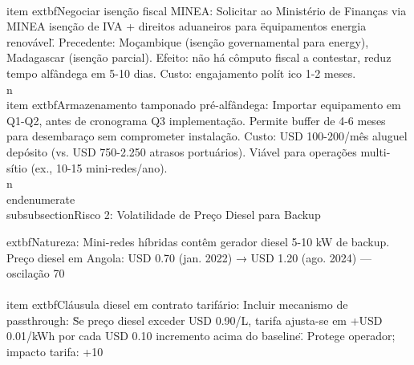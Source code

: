\documentclass[12pt, a4paper]{article}
\begin{document}
{{{{{{{{{\\item 	extbf{Negociar isenção fiscal MINEA:} Solicitar ao Ministério de Finanças via MINEA isenção de IVA + direitos aduaneiros para \"equipamentos energia renovável\". Precedente: Moçambique (isenção governamental para energy), Madagascar (isenção parcial). Efeito: não há cômputo fiscal a contestar, reduz tempo alfândega em 5-10 dias. Custo: engajamento polít ico 1-2 meses.\\n\n\\item 	extbf{Armazenamento tamponado pré-alfândega:} Importar equipamento em Q1-Q2, antes de cronograma Q3 implementação. Permite buffer de 4-6 meses para desembaraço sem comprometer instalação. Custo: USD 100-200/mês aluguel depósito (vs. USD 750-2.250 atrasos portuários). Viável para operações multi-sítio (ex., 10-15 mini-redes/ano).\\n\\end{enumerate}\n\n\\subsubsection{Risco 2: Volatilidade de Preço Diesel para Backup}

	extbf{Natureza:} Mini-redes híbridas contêm gerador diesel 5-10 kW de backup. Preço diesel em Angola: USD 0.70 (jan. 2022) → USD 1.20 (ago. 2024) — oscilação 70\\%
\\item 	extbf{Cláusula diesel em contrato tarifário:} Incluir mecanismo de passthrough: \"Se preço diesel exceder USD 0.90/L, tarifa ajusta-se em +USD 0.01/kWh por cada USD 0.10 incremento acima do baseline\". Protege operador; impacto tarifa: +10\\%

}}}}}}}}}
\end{document}
